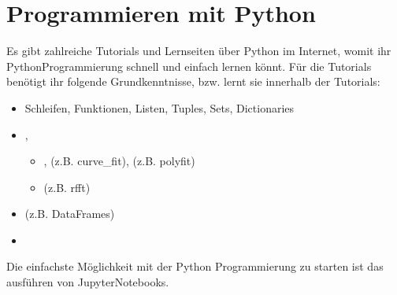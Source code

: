 \documentclass[letterpaper,10pt,english]{jupyterBook}
\begin{document}
\section{Programmieren mit Python}
\label{\detokenize{content/00_jupyter:programmieren-mit-python}}
\sphinxAtStartPar
Es gibt zahlreiche Tutorials und Lernseiten über Python im Internet, womit ihr Python\sphinxhyphen{}Programmierung schnell und einfach lernen könnt. Für die Tutorials benötigt ihr folgende Grundkenntnisse, bzw. lernt sie innerhalb der Tutorials:
\begin{itemize}
\item {} 
\sphinxAtStartPar
{} Schleifen, Funktionen, Listen, Tuples, Sets, Dictionaries

\item {} 
\sphinxAtStartPar
{} , 
\begin{itemize}
\item {} 
\sphinxAtStartPar
{} ,  (z.B. curve\_fit),  (z.B. polyfit)

\item {} 
\sphinxAtStartPar
{}  (z.B. rfft)

\end{itemize}

\item {} 
\sphinxAtStartPar
{}  (z.B. DataFrames)

\item {} 
\sphinxAtStartPar
{} 

\end{itemize}

\sphinxAtStartPar
Die einfachste Möglichkeit mit der Python Programmierung zu starten ist das ausführen von Jupyter\sphinxhyphen{}Notebooks.
\end{document}
